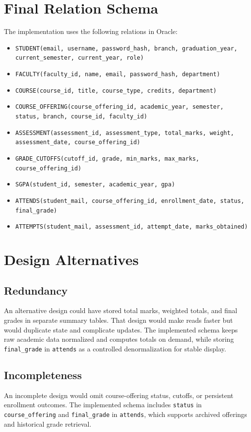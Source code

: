 \documentclass[12pt,a4paper]{report}
\begin{document}
\section{Final Relation Schema}
The implementation uses the following relations in Oracle:
\begin{itemize}[leftmargin=1.5em]
  \item \texttt{STUDENT(email, username, password\_hash, branch, graduation\_year, current\_semester, current\_year, role)}
  \item \texttt{FACULTY(faculty\_id, name, email, password\_hash, department)}
  \item \texttt{COURSE(course\_id, title, course\_type, credits, department)}
  \item \texttt{COURSE\_OFFERING(course\_offering\_id, academic\_year, semester, status, branch, course\_id, faculty\_id)}
  \item \texttt{ASSESSMENT(assessment\_id, assessment\_type, total\_marks, weight, assessment\_date, course\_offering\_id)}
  \item \texttt{GRADE\_CUTOFFS(cutoff\_id, grade, min\_marks, max\_marks, course\_offering\_id)}
  \item \texttt{SGPA(student\_id, semester, academic\_year, gpa)}
  \item \texttt{ATTENDS(student\_mail, course\_offering\_id, enrollment\_date, status, final\_grade)}
  \item \texttt{ATTEMPTS(student\_mail, assessment\_id, attempt\_date, marks\_obtained)}
\end{itemize}

\section{Design Alternatives}
\subsection{Redundancy}
An alternative design could have stored total marks, weighted totals, and final grades in separate summary tables. That design would make reads faster but would duplicate state and complicate updates. The implemented schema keeps raw academic data normalized and computes totals on demand, while storing \texttt{final\_grade} in \texttt{attends} as a controlled denormalization for stable display.

\subsection{Incompleteness}
An incomplete design would omit course-offering status, cutoffs, or persistent enrollment outcomes. The implemented schema includes \texttt{status} in \texttt{course\_offering} and \texttt{final\_grade} in \texttt{attends}, which supports archived offerings and historical grade retrieval.
\end{document}
